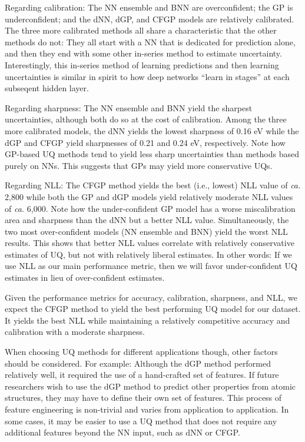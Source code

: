 \documentclass[]{achemso}
\begin{document}
Regarding calibration:  The \gls{NN} ensemble and \gls{BNN} are overconfident; the \gls{GP} is underconfident; and the \gls{dNN}, \gls{dGP}, and \gls{CFGP} models are relatively calibrated.
The three more calibrated methods all share a characteristic that the other methods do not:  They all start with a \gls{NN} that is dedicated for prediction alone, and then they end with some other in-series method to estimate uncertainty.
Interestingly, this in-series method of learning predictions and then learning uncertainties is similar in spirit to how deep networks ``learn in stages'' at each subseqent hidden layer.

Regarding sharpness:  The \gls{NN} ensemble and \gls{BNN} yield the sharpest uncertainties, although both do so at the cost of calibration.
Among the three more calibrated models, the \gls{dNN} yields the lowest sharpness of 0.16 eV while the \gls{dGP} and \gls{CFGP} yield sharpnesses of 0.21 and 0.24 eV, respectively.
Note how \gls{GP}-based \gls{UQ} methods tend to yield less sharp uncertainties than methods based purely on \gls{NN}s.
This suggests that \gls{GP}s may yield more conservative \gls{UQ}s.

Regarding \gls{NLL}:  The \gls{CFGP} method yields the best (i.e., lowest) \gls{NLL} value of \textit{ca.} 2,800 while both the \gls{GP} and \gls{dGP} models yield relatively moderate \gls{NLL} values of \textit{ca.} 6,000.
Note how the under-confident \gls{GP} model has a worse miscalibration area and sharpness than the \gls{dNN} but a better \gls{NLL} value.
Simultaneously, the two most over-confident models (\gls{NN} ensemble and \gls{BNN}) yield the worst \gls{NLL} results.
This shows that better \gls{NLL} values correlate with relatively conservative estimates of \gls{UQ}, but not with relatively liberal estimates.
In other words:  If we use \gls{NLL} as our main performance metric, then we will favor under-confident \gls{UQ} estimates in lieu of over-confident estimates.

Given the performance metrics for accuracy, calibration, sharpness, and \gls{NLL}, we expect the \gls{CFGP} method to yield the best performing \gls{UQ} model for our dataset.
It yields the best \gls{NLL} while maintaining a relatively competitive accuracy and calibration with a moderate sharpness.

When choosing \gls{UQ} methods for different applications though, other factors should be considered.
For example:  Although the \gls{dGP} method performed relatively well, it required the use of a hand-crafted set of features.
If future researchers wish to use the \gls{dGP} method to predict other properties from atomic structures, they may have to define their own set of features.
This process of feature engineering is non-trivial and varies from application to application.
In some cases, it may be easier to use a \gls{UQ} method that does not require any additional features beyond the \gls{NN} input, such as \gls{dNN} or \gls{CFGP}.
\end{document}
